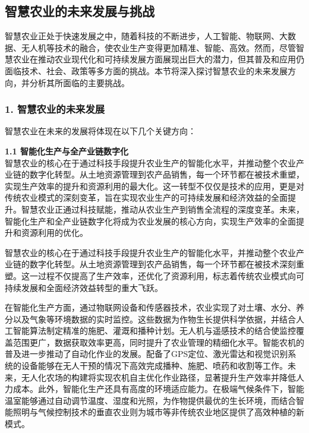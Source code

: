 \subsection{智慧农业的未来发展与挑战}

智慧农业正处于快速发展之中，随着科技的不断进步，人工智能、物联网、大数据、无人机等技术的融合，使农业生产变得更加精准、智能、高效。然而，尽管智慧农业在推动农业现代化和可持续发展方面展现出巨大的潜力，但其普及和应用仍面临技术、社会、政策等多方面的挑战。本节将深入探讨智慧农业的未来发展方向，并分析其所面临的主要挑战。

\subsubsection{1. 智慧农业的未来发展}

智慧农业在未来的发展将体现在以下几个关键方向：

\textbf{1.1 智能化生产与全产业链数字化} \\

智慧农业的核心在于通过科技手段提升农业生产的智能化水平，并推动整个农业产业链的数字化转型。从土地资源管理到农产品销售，每一个环节都在被技术重塑，实现生产效率的提升和资源利用的最大化。这一转型不仅仅是技术的应用，更是对传统农业模式的深刻变革，旨在实现农业生产的可持续发展和经济效益的全面提升。智慧农业正通过科技赋能，推动从农业生产到销售全流程的深度变革。未来，智能化生产和全产业链数字化将成为农业发展的核心方向，实现生产效率的全面提升和资源利用的优化。
 

智慧农业的核心在于通过科技手段提升农业生产的智能化水平，并推动整个农业产业链的数字化转型。从土地资源管理到农产品销售，每一个环节都在被技术深刻重塑。这一过程不仅提高了生产效率，还优化了资源利用，标志着传统农业模式向可持续发展和全面经济效益转型的重大飞跃。  

在智能化生产方面，通过物联网设备和传感器技术，农业实现了对土壤、水分、养分以及气象等环境数据的实时监控。这些数据为作物生长提供科学依据，并结合人工智能算法制定精准的施肥、灌溉和播种计划。无人机与遥感技术的结合使监控覆盖范围更广，数据获取效率更高，同时提升了农业管理的精细化水平。智能农机的普及进一步推动了自动化作业的发展。配备了GPS定位、激光雷达和视觉识别系统的设备能够在无人干预的情况下高效完成播种、施肥、喷药和收割等工作。未来，无人化农场的构建将实现农机自主优化作业路径，显著提升生产效率并降低人力成本。此外，智能化生产还具有高度的环境适应能力。在极端气候条件下，智能温室能够通过自动调节温度、湿度和光照，为作物提供最优的生长环境，而结合智能照明与气候控制技术的垂直农业则为城市等非传统农业地区提供了高效种植的新模式。  


